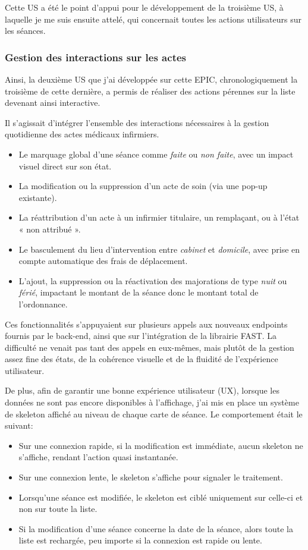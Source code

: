 \documentclass{article}
\begin{document}
Cette US a été le point d'appui pour le développement de la troisième US, à laquelle je me suis ensuite attelé, qui concernait toutes les actions utilisateurs sur les séances.

\subsubsection{Gestion des interactions sur les actes}

Ainsi, la deuxième US que j'ai développée sur cette EPIC, chronologiquement la troisième de cette dernière, a permis de réaliser des actions pérennes sur la liste devenant ainsi interactive.

Il s'agissait d'intégrer l'ensemble des interactions nécessaires à la gestion quotidienne des actes médicaux infirmiers.

\begin{itemize}
    \item Le marquage global d'une séance comme \textit{faite} ou \textit{non faite}, avec un impact visuel direct sur son état.
    \item La modification ou la suppression d'un acte de soin (via une pop-up existante).
    \item La réattribution d'un acte à un infirmier titulaire, un remplaçant, ou à l'état « non attribué ».
    \item Le basculement du lieu d'intervention entre \textit{cabinet} et \textit{domicile}, avec prise en compte automatique des frais de déplacement.
    \item L'ajout, la suppression ou la réactivation des majorations de type \textit{nuit} ou \textit{férié}, impactant le montant de la séance donc le montant total de l'ordonnance.
\end{itemize}

Ces fonctionnalités s'appuyaient sur plusieurs appels aux nouveaux endpoints fournis par le back-end, ainsi que sur l'intégration de la librairie FAST. La difficulté ne venait pas tant des appels en eux-mêmes, mais plutôt de la gestion assez fine des états, de la cohérence visuelle et de la fluidité de l'expérience utilisateur.

De plus, afin de garantir une bonne expérience utilisateur (UX), lorsque les données ne sont pas encore disponibles à l'affichage, j'ai mis en place un système de skeleton affiché au niveau de chaque carte de séance. Le comportement était le suivant:

\begin{itemize}
    \item Sur une connexion rapide, si la modification est immédiate, aucun skeleton ne s'affiche, rendant l'action quasi instantanée.
    \item Sur une connexion lente, le skeleton s'affiche pour signaler le traitement.
    \item Lorsqu'une séance est modifiée, le skeleton est ciblé uniquement sur celle-ci et non sur toute la liste.
    \item Si la modification d'une séance concerne la date de la séance, alors toute la liste est rechargée, peu importe si la connexion est rapide ou lente.
\end{itemize}
\end{document}
